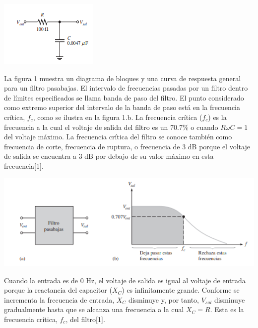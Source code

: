 \documentclass[DIV=calc, paper=a4, fontsize=11pt]{scrartcl}
\newenvironment{Figura}
  {\par\medskip\noindent\minipage{\linewidth}}
  {\endminipage\par\medskip}
\begin{document}
\begin{multicols}{2}
\begin{Figura}
    \centering
    \includegraphics[width=0.9 \textwidth]{pasabajas.PNG}
    \label{fig}
\end{Figura}

La figura 1 muestra un diagrama de bloques y una curva de respuesta general para un filtro pasabajas. El intervalo de frecuencias pasadas por un filtro dentro de límites especificados se llama banda de paso del filtro. El punto considerado como extremo superior del intervalo de la banda de paso está en la frecuencia crítica, $f_c$, como se ilustra en la figura 1.b. La frecuencia crítica ($f_c$) es la frecuencia a la cual el voltaje de salida del filtro es un 70.7\% o cuando $R\omega C = 1$ del voltaje máximo. La frecuencia crítica del filtro se conoce también como frecuencia de corte, frecuencia de ruptura, o frecuencia de 3 dB porque el voltaje de salida se encuentra a 3 dB por debajo de su valor máximo en esta frecuencia[1].

\begin{Figura}
    \centering
    \includegraphics[width=1 \textwidth]{pasabajas1.PNG}
    \label{fig}
\end{Figura}

Cuando la entrada es de 0 Hz, el voltaje de salida es igual al voltaje de entrada porque la reactancia del capacitor  ($X_C$) es infinitamente grande. Conforme se incrementa la frecuencia de entrada, $X_C$ disminuye y, por
tanto, $V_{sal}$ disminuye gradualmente hasta que se alcanza una frecuencia a la cual $X_C=R$. Esta es
la frecuencia crítica, $f_c$, del filtro[1].


\end{multicols}
\end{document}
